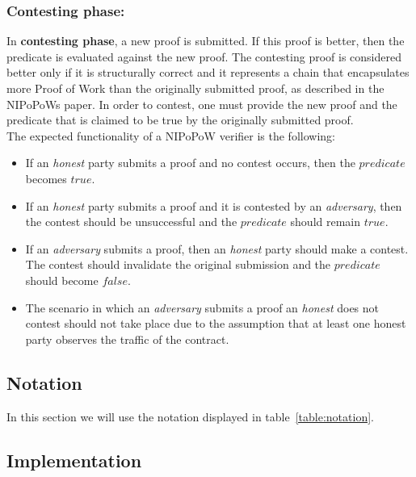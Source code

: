 \subsubsection{Contesting phase:} In \textbf{contesting phase}, a new proof is
submitted. If this proof is better, then the predicate is evaluated against the
new proof. The contesting proof is considered better only if it is structurally
correct and it represents a chain that encapsulates more Proof of Work than the
originally submitted proof, as described in the NIPoPoWs paper.  In order to
contest, one must provide the new proof and the predicate that is claimed to be
true by the originally submitted proof.\\

The expected functionality of a NIPoPoW verifier is the following:
\begin{itemize}

    \item
        If an \textit{honest} party submits a proof and no contest occurs, then
        the $predicate$ becomes $true$.

    \item
        If an \textit{honest} party submits a proof and it is contested by an
        \textit{adversary}, then the contest should be unsuccessful and the
        $predicate$ should remain $true$.

    \item
        If an \textit{adversary} submits a proof, then an \textit{honest} party
        should make a contest. The contest should invalidate the original
        submission and the $predicate$ should become $false$.

    \item
        The scenario in which an \textit{adversary} submits a proof an
        \textit{honest} does not contest should not take place due to the
        assumption that at least one honest party observes the traffic of the
        contract.

\end{itemize}

\subsection{Notation}

In this section we will use the notation displayed in
table~\ref{table:notation}.

%

\subsection{Implementation}


